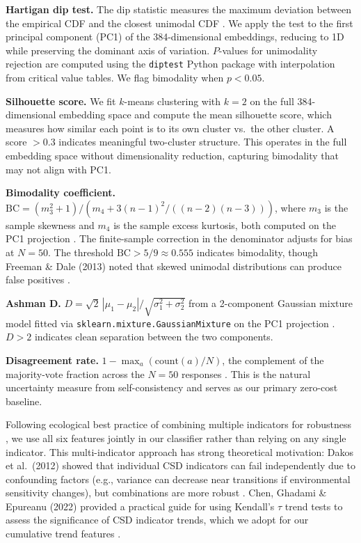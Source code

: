 \documentclass[11pt,letterpaper]{article}
\begin{document}
\textbf{Hartigan dip test.} The dip statistic measures the maximum deviation between the empirical CDF and the closest unimodal CDF \cite{hartigan1985}. We apply the test to the first principal component (PC1) of the 384-dimensional embeddings, reducing to 1D while preserving the dominant axis of variation. $P$-values for unimodality rejection are computed using the \texttt{diptest} Python package with interpolation from critical value tables. We flag bimodality when $p < 0.05$.

\textbf{Silhouette score.} We fit $k$-means clustering with $k=2$ on the full 384-dimensional embedding space and compute the mean silhouette score, which measures how similar each point is to its own cluster vs.\ the other cluster. A score $> 0.3$ indicates meaningful two-cluster structure. This operates in the full embedding space without dimensionality reduction, capturing bimodality that may not align with PC1.

\textbf{Bimodality coefficient.} $\text{BC} = (m_3^2 + 1) / (m_4 + 3(n{-}1)^2/((n{-}2)(n{-}3)))$, where $m_3$ is the sample skewness and $m_4$ is the sample excess kurtosis, both computed on the PC1 projection \cite{freeman2013, kang2019}. The finite-sample correction in the denominator adjusts for bias at $N=50$. The threshold $\text{BC} > 5/9 \approx 0.555$ indicates bimodality, though Freeman \& Dale (2013) noted that skewed unimodal distributions can produce false positives \cite{freeman2013}.

\textbf{Ashman D.} $D = \sqrt{2}\,|\mu_1 - \mu_2| / \sqrt{\sigma_1^2 + \sigma_2^2}$ from a 2-component Gaussian mixture model fitted via \texttt{sklearn.mixture.GaussianMixture} on the PC1 projection \cite{ashman1994}. $D > 2$ indicates clean separation between the two components.

\textbf{Disagreement rate.} $1 - \max_a(\text{count}(a)/N)$, the complement of the majority-vote fraction across the $N=50$ responses \cite{wang2023selfconsistency}. This is the natural uncertainty measure from self-consistency and serves as our primary zero-cost baseline.

Following ecological best practice of combining multiple indicators for robustness \cite{dakos2012methods, ghadami2022}, we use all six features jointly in our classifier rather than relying on any single indicator. This multi-indicator approach has strong theoretical motivation: Dakos et al.~(2012) showed that individual CSD indicators can fail independently due to confounding factors (e.g., variance can decrease near transitions if environmental sensitivity changes), but combinations are more robust \cite{dakos2012robustness}. Chen, Ghadami \& Epureanu (2022) provided a practical guide for using Kendall's $\tau$ trend tests to assess the significance of CSD indicator trends, which we adopt for our cumulative trend features \cite{ghadami2022}.
\end{document}
